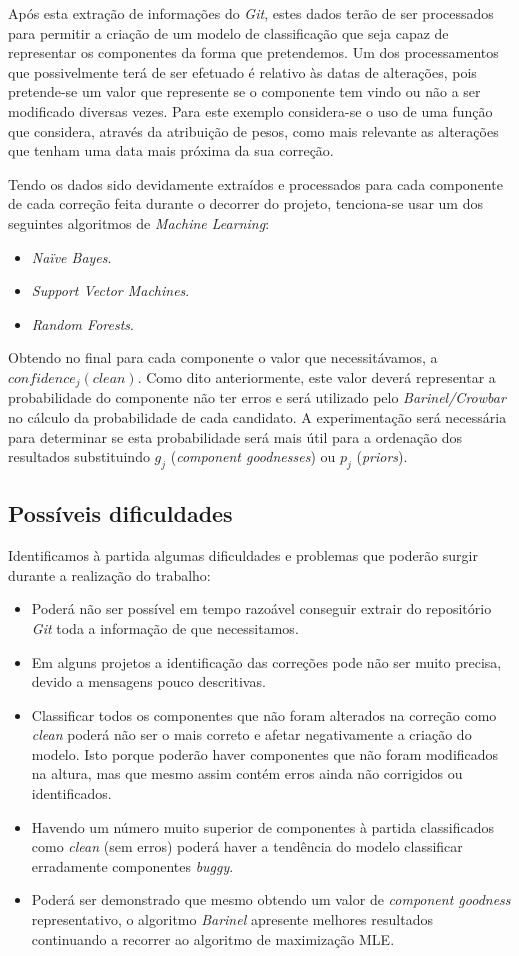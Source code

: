 Após esta extração de informações do \emph{Git}, estes dados terão de ser processados para permitir a criação de um modelo de classificação que seja capaz de representar os componentes da forma que pretendemos. Um dos processamentos que possivelmente terá de ser efetuado é relativo às datas de alterações, pois pretende-se um valor que represente se o componente tem vindo ou não a ser modificado diversas vezes. Para este exemplo considera-se o uso de uma função que considera, através da atribuição de pesos, como mais relevante as alterações que tenham uma data mais próxima da sua correção.

Tendo os dados sido devidamente extraídos e processados para cada componente de cada correção feita durante o decorrer do projeto, tenciona-se usar um dos seguintes algoritmos de \emph{Machine Learning}:
%
\begin{itemize}
	\item \emph{Naïve Bayes}.
	\item \emph{Support Vector Machines}.
	\item \emph{Random Forests}.
\end{itemize}

Obtendo no final para cada componente o valor que necessitávamos, a $confidence_j(clean)$. Como dito anteriormente, este valor deverá representar a probabilidade do componente não ter erros e será utilizado pelo \emph{Barinel/Crowbar} no cálculo da probabilidade de cada candidato. A experimentação será necessária para determinar se esta probabilidade será mais útil para a ordenação dos resultados substituindo $g_j$ (\emph{component goodnesses}) ou $p_j$ (\emph{priors}).

\subsection{Possíveis dificuldades}

Identificamos à partida algumas dificuldades e problemas que poderão surgir durante a realização do trabalho:
%
\begin{itemize}
	\item Poderá não ser possível em tempo razoável conseguir extrair do repositório \emph{Git} toda a informação de que necessitamos.
	\item Em alguns projetos a identificação das correções pode não ser muito precisa, devido a mensagens pouco descritivas.
	\item Classificar todos os componentes que não foram alterados na correção como \emph{clean} poderá não ser o mais correto e afetar negativamente a criação do modelo. Isto porque poderão haver componentes que não foram modificados na altura, mas que mesmo assim contém erros ainda não corrigidos ou identificados.
	\item Havendo um número muito superior de componentes à partida classificados como \emph{clean} (sem erros) poderá haver a tendência do modelo classificar erradamente componentes \emph{buggy}.
	\item Poderá ser demonstrado que mesmo obtendo um valor de \emph{component goodness} representativo, o algoritmo \emph{Barinel} apresente melhores resultados continuando a recorrer ao algoritmo de maximização MLE.
\end{itemize}
